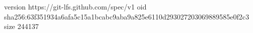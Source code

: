 version https://git-lfs.github.com/spec/v1
oid sha256:63f351934a6afa5c15a1bcabc9aba9a825e6110d293027203069889585e0f2c3
size 244137
